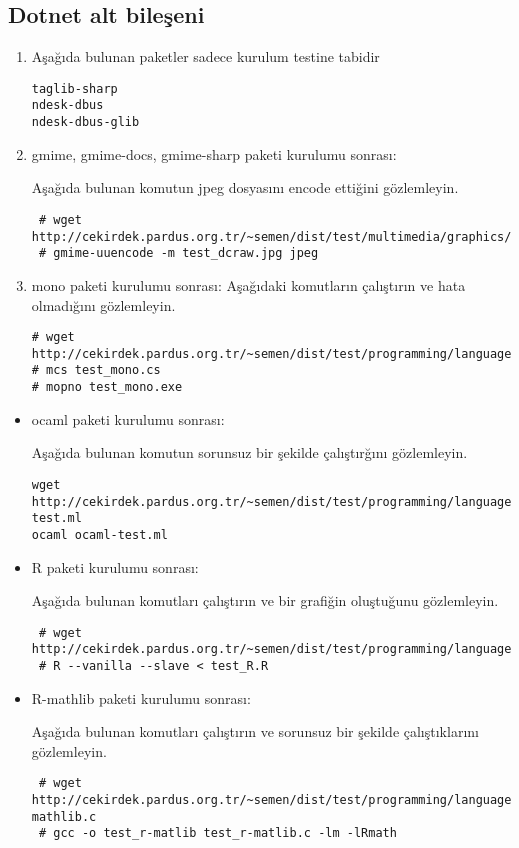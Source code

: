 \documentclass[a4paper,10pt]{article}
\begin{document}
\subsection{Dotnet alt bileşeni}
\begin{enumerate}

\item Aşağıda bulunan paketler sadece kurulum testine tabidir
\begin{verbatim}
taglib-sharp
ndesk-dbus
ndesk-dbus-glib
\end{verbatim}

 \item gmime, gmime-docs, gmime-sharp paketi kurulumu sonrası:

Aşağıda bulunan komutun jpeg dosyasını encode ettiğini gözlemleyin.
\begin{verbatim}
 # wget http://cekirdek.pardus.org.tr/~semen/dist/test/multimedia/graphics/test_dcraw.jpg
 # gmime-uuencode -m test_dcraw.jpg jpeg
\end{verbatim}


 \item mono paketi kurulumu sonrası:
Aşağıdaki komutların çalıştırın ve hata olmadığını gözlemleyin.
\begin{verbatim}
# wget http://cekirdek.pardus.org.tr/~semen/dist/test/programming/language/dotnet/test_mono.cs
# mcs test_mono.cs
# mopno test_mono.exe
\end{verbatim}
\end{enumerate}


\begin{itemize}
\item ocaml paketi kurulumu sonrası:

Aşağıda bulunan komutun sorunsuz bir şekilde çalıştırğını gözlemleyin.
\begin{verbatim}
wget http://cekirdek.pardus.org.tr/~semen/dist/test/programming/language/ocaml-test.ml 
ocaml ocaml-test.ml
\end{verbatim}

 \item R paketi kurulumu sonrası:

Aşağıda bulunan komutları çalıştırın ve bir grafiğin oluştuğunu gözlemleyin.
\begin{verbatim}
 # wget http://cekirdek.pardus.org.tr/~semen/dist/test/programming/language/test_R.R
 # R --vanilla --slave < test_R.R
\end{verbatim}
\item R-mathlib paketi kurulumu sonrası:

Aşağıda bulunan komutları çalıştırın ve sorunsuz bir şekilde çalıştıklarını gözlemleyin.	
\begin{verbatim}
 # wget http://cekirdek.pardus.org.tr/~semen/dist/test/programming/language/test_r-mathlib.c
 # gcc -o test_r-matlib test_r-matlib.c -lm -lRmath
\end{verbatim}
\end{itemize}
\end{document}
